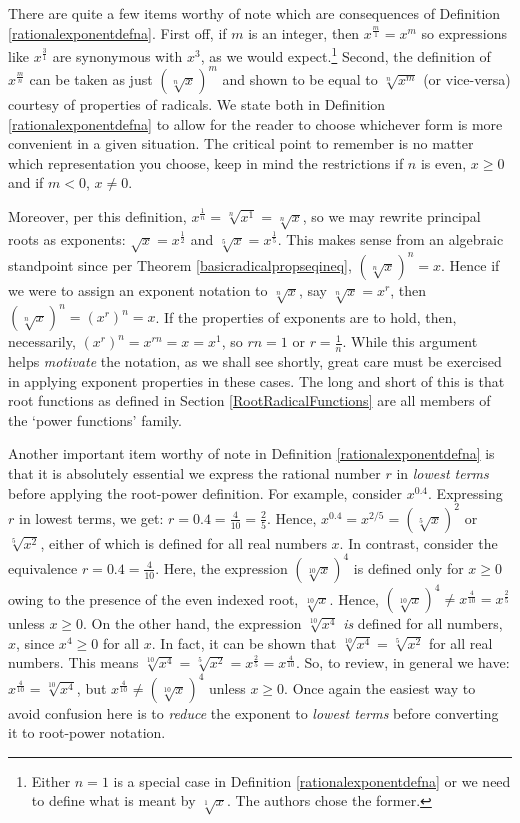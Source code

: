 \documentclass{ximera}
\begin{document}
\smallskip

There are quite a few items worthy of note which are consequences of Definition \ref{rationalexponentdefna}.  First off, if $m$ is an integer, then $x^{\frac{m}{1}}  = x^{m}$ so expressions like $x^{\frac{3}{1}}$  are synonymous with  $x^3$, as we would expect.\footnote{Either $n=1$ is a special case in Definition \ref{rationalexponentdefna} or we need to define what is meant by $\sqrt[1]{x}$.  The authors chose the former.}   Second, the definition of $x^{\frac{m}{n}}$ can be taken as just $\left(\sqrt[n]{x}\right)^m$ and shown to be equal to $\sqrt[n]{x^m}$ (or vice-versa) courtesy of properties of radicals.  We state both in  Definition \ref{rationalexponentdefna} to allow for the reader to choose whichever form is more convenient in a given situation.  The  critical point to remember is no matter which representation you choose, keep in mind the restrictions if $n$ is even, $x \geq 0$ and if $m < 0$, $x \neq 0$.  

Moreover,  per this definition,  $x^{\frac{1}{n}} = \sqrt[n]{x^{1}} = \sqrt[n]{x}$, so we may rewrite principal roots as exponents: $\sqrt{x} = x^{\frac{1}{2}}$ and $\sqrt[5]{x} = x^{\frac{1}{5}}$. This makes sense from an algebraic standpoint since per Theorem \ref{basicradicalpropseqineq}, $\left(\sqrt[n]{x} \right)^n = x$.  Hence if we were to assign an exponent notation to  $\sqrt[n]{x}$, say $\sqrt[n]{x} = x^r$, then  $\left(\sqrt[n]{x}\right)^n = (x^r)^n = x$.  If the properties of exponents are to hold, then, necessarily, $ (x^r)^n = x^{rn} = x = x^{1}$, so $rn = 1$ or $r = \frac{1}{n}$. While this argument helps \textit{motivate} the notation, as we shall see shortly, great care must be exercised in applying exponent properties in these cases.  The long and short of this is that root functions as defined in Section \ref{RootRadicalFunctions} are all members of the `power functions' family.
  
Another important item worthy of note in Definition \ref {rationalexponentdefna} is that it is absolutely essential  we express the rational number $r$ in \textit{lowest terms} before applying the root-power definition.  For example, consider $x^{0.4}$. Expressing $r$ in lowest terms, we get:  $r = 0.4 = \frac{4}{10} = \frac{2}{5}$.  Hence,  $x^{0.4} = x^{2/5} = (\sqrt[5]{x})^2$ or $\sqrt[5]{x^2}$, either of which is defined for all real numbers $x$.  In contrast, consider the equivalence $r = 0.4 = \frac{4}{10}$.  Here, the expression $(\sqrt[10]{x})^4$ is defined only for $x \geq 0$ owing to the presence of the even indexed root, $\sqrt[10]{x}$.  Hence, $(\sqrt[10]{x})^4 \neq x^{\frac{4}{10}} = x^{\frac{2}{5}}$ unless $x \geq 0$.   On the other hand,  the expression $\sqrt[10]{x^4}$ \textit{is} defined for all numbers, $x$, since $x^4 \geq 0$ for all $x$. In fact,  it can be shown that $\sqrt[10]{x^4} = \sqrt[5]{x^2}$ for all real numbers.  This means  $\sqrt[10]{x^4} =  \sqrt[5]{x^2} = x^{\frac{2}{5}} = x^{\frac{4}{10}}$.   So, to review, in general we have: $x^{\frac{4}{10}} = \sqrt[10]{x^4}$, but $x^{\frac{4}{10}}   \neq \left(\sqrt[10]{x}\right)^{4}$ unless $x \geq 0$.  Once again the easiest way to avoid confusion here is to \textit{reduce} the exponent to \textit{lowest terms} before converting it to root-power notation.
\end{document}
